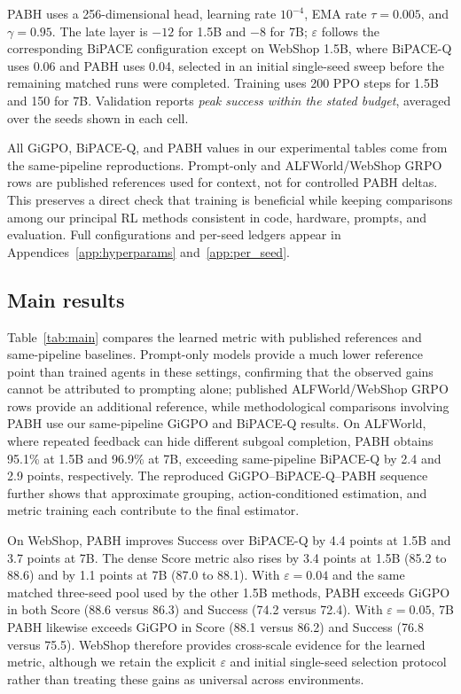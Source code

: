 \documentclass[10pt,twocolumn,letterpaper]{article}
\newcommand{\method}{PABH\xspace}
\begin{document}
\method uses a 256-dimensional head, learning rate $10^{-4}$, EMA rate $\tau=0.005$, and $\gamma=0.95$. The late layer is $-12$ for 1.5B and $-8$ for 7B; $\varepsilon$ follows the corresponding BiPACE configuration except on WebShop 1.5B, where BiPACE-Q uses 0.06 and \method uses 0.04, selected in an initial single-seed sweep before the remaining matched runs were completed. Training uses 200 PPO steps for 1.5B and 150 for 7B. Validation reports \emph{peak success within the stated budget}, averaged over the seeds shown in each cell.

All GiGPO, BiPACE-Q, and \method values in our experimental tables come from the same-pipeline reproductions. Prompt-only and ALFWorld/WebShop GRPO rows are published references used for context, not for controlled \method deltas. This preserves a direct check that training is beneficial while keeping comparisons among our principal RL methods consistent in code, hardware, prompts, and evaluation. Full configurations and per-seed ledgers appear in Appendices~\ref{app:hyperparams} and~\ref{app:per_seed}.



\subsection{Main results}
\label{sec:main}
Table~\ref{tab:main} compares the learned metric with published references and same-pipeline baselines. Prompt-only models provide a much lower reference point than trained agents in these settings, confirming that the observed gains cannot be attributed to prompting alone; published ALFWorld/WebShop GRPO rows provide an additional reference, while methodological comparisons involving \method use our same-pipeline GiGPO and BiPACE-Q results. On ALFWorld, where repeated feedback can hide different subgoal completion, \method obtains 95.1\% at 1.5B and 96.9\% at 7B, exceeding same-pipeline BiPACE-Q by 2.4 and 2.9 points, respectively. The reproduced GiGPO--BiPACE-Q--\method sequence further shows that approximate grouping, action-conditioned estimation, and metric training each contribute to the final estimator.

On WebShop, \method improves Success over BiPACE-Q by 4.4 points at 1.5B and 3.7 points at 7B. The dense Score metric also rises by 3.4 points at 1.5B (85.2 to 88.6) and by 1.1 points at 7B (87.0 to 88.1). With $\varepsilon=0.04$ and the same matched three-seed pool used by the other 1.5B methods, \method exceeds GiGPO in both Score (88.6 versus 86.3) and Success (74.2 versus 72.4). With $\varepsilon=0.05$, 7B \method likewise exceeds GiGPO in Score (88.1 versus 86.2) and Success (76.8 versus 75.5). WebShop therefore provides cross-scale evidence for the learned metric, although we retain the explicit $\varepsilon$ and initial single-seed selection protocol rather than treating these gains as universal across environments.
\end{document}
